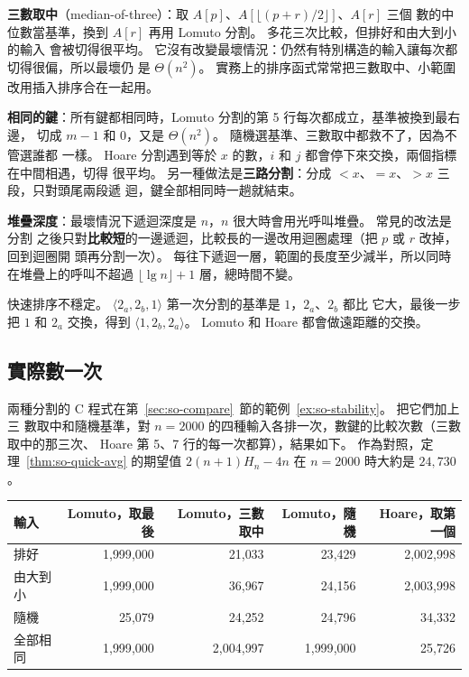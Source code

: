 \textbf{三數取中}（median-of-three）：取 $A[p]$、$A[\lfloor (p+r)/2 \rfloor]$、$A[r]$ 三個
數的中位數當基準，換到 $A[r]$ 再用 Lomuto 分割。 多花三次比較，但排好和由大到小的輸入
會被切得很平均。 它沒有改變最壞情況：仍然有特別構造的輸入讓每次都切得很偏，所以最壞仍
是 $\Theta(n^2)$。 實務上的排序函式常常把三數取中、小範圍改用插入排序合在一起用。

\textbf{相同的鍵}：所有鍵都相同時，Lomuto 分割的第 5 行每次都成立，基準被換到最右邊，
切成 $m - 1$ 和 $0$，又是 $\Theta(n^2)$。 隨機選基準、三數取中都救不了，因為不管選誰都
一樣。 Hoare 分割遇到等於 $x$ 的數，$i$ 和 $j$ 都會停下來交換，兩個指標在中間相遇，切得
很平均。 另一種做法是\textbf{三路分割}：分成 $< x$、$= x$、$> x$ 三段，只對頭尾兩段遞
迴，鍵全部相同時一趟就結束。

\textbf{堆疊深度}：最壞情況下遞迴深度是 $n$，$n$ 很大時會用光呼叫堆疊。 常見的改法是分割
之後只對\textbf{比較短}的一邊遞迴，比較長的一邊改用迴圈處理（把 $p$ 或 $r$ 改掉，回到迴圈開
頭再分割一次）。 每往下遞迴一層，範圍的長度至少減半，所以同時在堆疊上的呼叫不超過
$\lfloor \lg n \rfloor + 1$ 層，總時間不變。

快速排序不穩定。 $\langle 2_a, 2_b, 1 \rangle$ 第一次分割的基準是 $1$，$2_a$、$2_b$ 都比
它大，最後一步把 $1$ 和 $2_a$ 交換，得到 $\langle 1, 2_b, 2_a \rangle$。 Lomuto 和 Hoare
都會做遠距離的交換。

\subsection{實際數一次}

兩種分割的 C 程式在第~\ref{sec:so-compare}~節的範例~\ref{ex:so-stability}。 把它們加上三
數取中和隨機基準，對 $n = 2000$ 的四種輸入各排一次，數鍵的比較次數（三數取中的那三次、
Hoare 第 5、7 行的每一次都算），結果如下。 作為對照，定理~\ref{thm:so-quick-avg} 的期望值
$2(n+1)H_n - 4n$ 在 $n = 2000$ 時大約是 $24{,}730$。

\begin{center}
\begin{tabular}{lrrrr}
\toprule
輸入 & Lomuto，取最後 & Lomuto，三數取中 & Lomuto，隨機 & Hoare，取第一個 \\
\midrule
排好 & 1{,}999{,}000 & 21{,}033 & 23{,}429 & 2{,}002{,}998 \\
由大到小 & 1{,}999{,}000 & 36{,}967 & 24{,}156 & 2{,}003{,}998 \\
隨機 & 25{,}079 & 24{,}252 & 24{,}796 & 34{,}332 \\
全部相同 & 1{,}999{,}000 & 2{,}004{,}997 & 1{,}999{,}000 & 25{,}726 \\
\bottomrule
\end{tabular}
\end{center}

